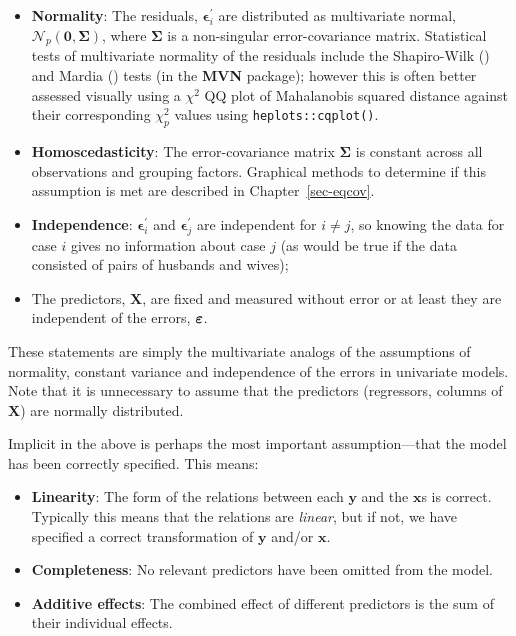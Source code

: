 \documentclass[
  letterpaper,
  10pt,
  krantz2]{krantz}
\providecommand{\tightlist}{%
  \setlength{\itemsep}{0pt}\setlength{\parskip}{0pt}}\usepackage{longtable,booktabs,array}
\begin{document}
\begin{itemize}
\tightlist
\item
  \textbf{Normality}: The residuals, \(\mathbf{\epsilon}_{i}^{\prime}\)
  are distributed as multivariate normal,
  \(\mathcal{N}_{p}(\mathbf{0},\boldsymbol{\Sigma})\), where
  \(\mathbf{\Sigma}\) is a non-singular error-covariance matrix.
  Statistical tests of multivariate normality of the residuals include
  the Shapiro-Wilk () and Mardia () tests
  (in the \textbf{MVN} package); however this is often better assessed
  visually using a \(\chi^2\) QQ plot of Mahalanobis squared distance
  against their corresponding \(\chi^2_p\) values using
  \texttt{heplots::cqplot()}.
\item
  \textbf{Homoscedasticity}: The error-covariance matrix
  \(\mathbf{\Sigma}\) is constant across all observations and grouping
  factors. Graphical methods to determine if this assumption is met are
  described in Chapter~\ref{sec-eqcov}.
\item
  \textbf{Independence}: \(\mathbf{\epsilon}_{i}^{\prime}\) and
  \(\mathbf{\epsilon}_{j}^{\prime}\) are independent for \(i\neq j\), so
  knowing the data for case \(i\) gives no information about case \(j\)
  (as would be true if the data consisted of pairs of husbands and
  wives);
\item
  The predictors, \(\mathbf{X}\), are fixed and measured without error
  or at least they are independent of the errors,
  \(\boldsymbol{\Large\varepsilon}\).
\end{itemize}

These statements are simply the multivariate analogs of the assumptions
of normality, constant variance and independence of the errors in
univariate models. Note that it is unnecessary to assume that the
predictors (regressors, columns of \(\mathbf{X}\)) are normally
distributed.

Implicit in the above is perhaps the most important assumption---that
the model has been correctly specified. This means:

\begin{itemize}
\item
  \textbf{Linearity}: The form of the relations between each
  \(\mathbf{y}\) and the \(\mathbf{x}\)s is correct. Typically this
  means that the relations are \emph{linear}, but if not, we have
  specified a correct transformation of \(\mathbf{y}\) and/or
  \(\mathbf{x}\).
\item
  \textbf{Completeness}: No relevant predictors have been omitted from
  the model.
\item
  \textbf{Additive effects}: The combined effect of different predictors
  is the sum of their individual effects.
\end{itemize}
\end{document}
